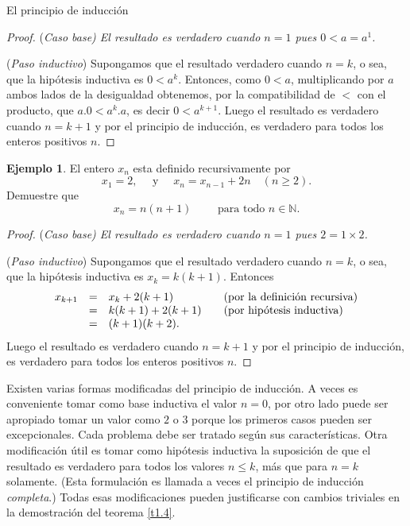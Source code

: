\documentclass[11pt,spanish,makeidx]{amsbook}
\theoremstyle{definition}
\newtheorem{ejemplo}{Ejemplo}[section]
\theoremstyle{remark}
\begin{document}
\begin{section}{El principio de inducción}
\begin{proof}
\noindent(\it Caso  base\rm) El resultado es verdadero cuando $n=1$ pues $ 0 < a=a^1$.

\noindent ({\it Paso  inductivo})  Supongamos que el resultado verdadero cuando $n=k$, o sea, que la hipótesis inductiva es $0 < a^k$. Entonces, como $0<a$, multiplicando por $a$ ambos lados de la desigualdad obtenemos, por la compatibilidad de $<$ con el producto, que $a{.}0 < a^k{.}a$, es decir $0<a^{k+1}$. Luego el resultado es verdadero cuando $n=k+1$ y por el principio de inducción, es verdadero para todos los enteros positivos $n$.
\end{proof}

\begin{ejemplo} El entero $x_n$ esta definido recursivamente por
$$
x_1=2, \quad \text{ y } \quad x_n=x_{n-1} +2n \quad (n\ge 2).
$$
Demuestre que
$$
x_n = n(n+1) \qquad \text{ para todo } n\in \mathbb N.
$$
\end{ejemplo}
\begin{proof}

\noindent(\it Caso  base\rm) El resultado es verdadero cuando $n=1$ pues $ 2=1\times2$.

\noindent ({\it Paso  inductivo})  Supongamos que el resultado verdadero cuando $n=k$, o sea, que la hipótesis inductiva es $x_k = k(k+1)$. Entonces
$$
\begin{matrix} 
x_{k+1} &=& x_k + 2(k+1) \hfill &\quad \text{(por la definición recursiva)} \hfill \\
&=& k(k+1)+2(k+1) \hfill &\quad \text{(por hipótesis inductiva)}\hfill \\
&=& (k+1)(k+2). \hfill &
\end{matrix}
$$
Luego el resultado es verdadero cuando $n=k+1$ y por el principio de inducción, es verdadero para todos los enteros positivos $n$.
\end{proof}

Existen varias formas modificadas del principio de inducción. A veces es conveniente tomar como base inductiva el valor $n=0$, por otro lado puede ser apropiado tomar un valor como $2$ o $3$ porque los primeros casos pueden ser excepcionales. Cada problema debe ser tratado según sus características. Otra modificación útil es tomar como hipótesis inductiva la suposición de que el resultado es verdadero para todos los valores $n\le k$, más que para $n=k$ solamente. (Esta formulación es llamada a veces el principio de inducción {\it completa}.) Todas esas modificaciones pueden justificarse con cambios triviales en la demostración del teorema \ref{t1.4}.


\end{section}
\end{document}
